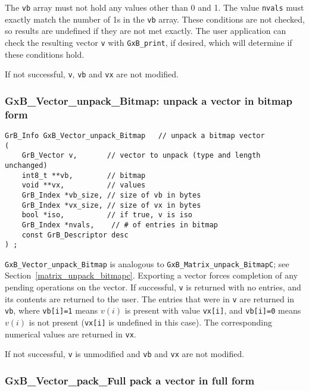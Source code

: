 \documentclass[12pt]{article}
\begin{document}
The \verb'vb' array must not hold any values other than 0 and 1.  The value
\verb'nvals' must exactly match the number of 1s in the \verb'vb' array.  These
conditions are not checked, so results are undefined if they are not met
exactly.  The user application can check the resulting vector \verb'v' with
\verb'GxB_print', if desired, which will determine if these conditions hold.

If not successful, \verb'v', \verb'vb' and
\verb'vx' are not modified.

\newpage
\subsubsection{{\sf GxB\_Vector\_unpack\_Bitmap:} unpack a vector in bitmap form}
\label{vector_unpack_bitmap}

\begin{mdframed}[userdefinedwidth=6in]
{\footnotesize
\begin{verbatim}
GrB_Info GxB_Vector_unpack_Bitmap   // unpack a bitmap vector
(
    GrB_Vector v,       // vector to unpack (type and length unchanged)
    int8_t **vb,        // bitmap
    void **vx,          // values
    GrB_Index *vb_size, // size of vb in bytes
    GrB_Index *vx_size, // size of vx in bytes
    bool *iso,          // if true, v is iso
    GrB_Index *nvals,    // # of entries in bitmap
    const GrB_Descriptor desc
) ;
\end{verbatim}
} \end{mdframed}

\verb'GxB_Vector_unpack_Bitmap' is analogous to
\verb'GxB_Matrix_unpack_BitmapC'; see
Section~\ref{matrix_unpack_bitmapc}.
Exporting a vector forces completion of any pending operations on the vector.
If successful, \verb'v' is returned with no entries, and its contents are
returned to the user.
The entries that were in \verb'v' are returned in
\verb'vb', where \verb'vb[i]=1' means $v(i)$ is present with value
\verb'vx[i]', and \verb'vb[i]=0' means $v(i)$ is not present (\verb'vx[i]' is
undefined in this case).  The corresponding numerical values are returned in
\verb'vx'.

If not successful, \verb'v' is unmodified and \verb'vb' and \verb'vx' are not
modified.

\newpage
\subsubsection{{\sf GxB\_Vector\_pack\_Full} pack a vector in full form}
\label{vector_pack_full}
\end{document}
